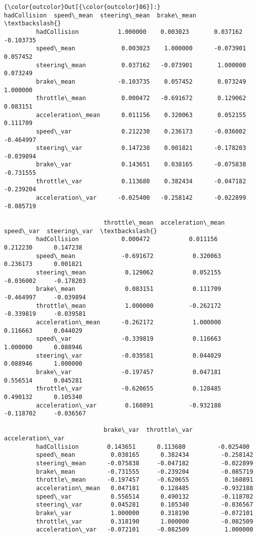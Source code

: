 \documentclass[11pt]{article}
\begin{document}
\begin{Verbatim}[commandchars=\\\{\}]
{\color{outcolor}Out[{\color{outcolor}86}]:}                    hadCollision  speed\_mean  steering\_mean  brake\_mean  \textbackslash{}
         hadCollision           1.000000    0.003023       0.037162   -0.103735   
         speed\_mean             0.003023    1.000000      -0.073901    0.057452   
         steering\_mean          0.037162   -0.073901       1.000000    0.073249   
         brake\_mean            -0.103735    0.057452       0.073249    1.000000   
         throttle\_mean          0.000472   -0.691672       0.129062    0.083151   
         acceleration\_mean      0.011156    0.320063       0.052155    0.111709   
         speed\_var              0.212230    0.236173      -0.036002   -0.464997   
         steering\_var           0.147238    0.001821      -0.178203   -0.039894   
         brake\_var              0.143651    0.038165      -0.075838   -0.731555   
         throttle\_var           0.113680    0.382434      -0.047182   -0.239204   
         acceleration\_var      -0.025400   -0.258142      -0.022899   -0.085719   
         
                            throttle\_mean  acceleration\_mean  speed\_var  steering\_var  \textbackslash{}
         hadCollision            0.000472           0.011156   0.212230      0.147238   
         speed\_mean             -0.691672           0.320063   0.236173      0.001821   
         steering\_mean           0.129062           0.052155  -0.036002     -0.178203   
         brake\_mean              0.083151           0.111709  -0.464997     -0.039894   
         throttle\_mean           1.000000          -0.262172  -0.339819     -0.039581   
         acceleration\_mean      -0.262172           1.000000   0.116663      0.044029   
         speed\_var              -0.339819           0.116663   1.000000      0.088946   
         steering\_var           -0.039581           0.044029   0.088946      1.000000   
         brake\_var              -0.197457           0.047181   0.556514      0.045281   
         throttle\_var           -0.620655           0.128485   0.490132      0.105340   
         acceleration\_var        0.160891          -0.932188  -0.118702     -0.036567   
         
                            brake\_var  throttle\_var  acceleration\_var  
         hadCollision        0.143651      0.113680         -0.025400  
         speed\_mean          0.038165      0.382434         -0.258142  
         steering\_mean      -0.075838     -0.047182         -0.022899  
         brake\_mean         -0.731555     -0.239204         -0.085719  
         throttle\_mean      -0.197457     -0.620655          0.160891  
         acceleration\_mean   0.047181      0.128485         -0.932188  
         speed\_var           0.556514      0.490132         -0.118702  
         steering\_var        0.045281      0.105340         -0.036567  
         brake\_var           1.000000      0.318190         -0.072101  
         throttle\_var        0.318190      1.000000         -0.082509  
         acceleration\_var   -0.072101     -0.082509          1.000000  
\end{Verbatim}
            
\end{document}
